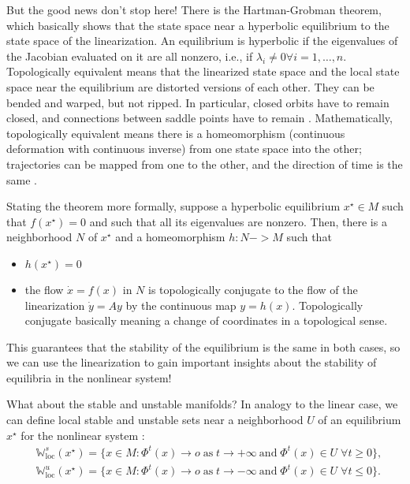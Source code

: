 But the good news don't stop here! There is the Hartman-Grobman theorem, which basically shows that the state space near a hyperbolic equilibrium to the state space of the linearization. An equilibrium is hyperbolic if the eigenvalues of the Jacobian evaluated on it are all nonzero, i.e., if $\lambda_i \neq 0 \forall i=1,\ldots,n$. Topologically equivalent means that the linearized state space and the local state space near the equilibrium are distorted versions of each other. They can be bended and warped, but not ripped. In particular, closed orbits have to remain closed, and connections between saddle points have to remain \cite{strogatz2002nonlinear}. Mathematically, topologically equivalent means there is a homeomorphism (continuous deformation with continuous inverse) from one state space into the other; trajectories can be mapped from one to the other, and the direction of time is the same \cite{strogatz2002nonlinear}. 

Stating the theorem more formally, suppose a hyperbolic equilibrium $x^\star \in M$ such that $f(x^\star) = 0$ and such that all its eigenvalues are nonzero. Then, there is a neighborhood $N$ of $x^\star$ and a homeomorphism $h: N->M$ such that \cite{argyris}
\begin{itemize}
    \item $h(x^\star) = 0$
    \item the flow $\dot{x} = f(x)$ in $N$ is topologically conjugate to the flow of the linearization $\dot{y} = A y$ by the continuous map $y = h(x)$. Topologically conjugate basically meaning a change of coordinates in a topological sense.
\end{itemize}

This guarantees that the stability of the equilibrium is the same in both cases, so we can use the linearization to gain important insights about the stability of equilibria in the nonlinear system! 

What about the stable and unstable manifolds? In analogy to the linear case, we can define local stable and unstable sets near a neighborhood $U$ of an equilibrium $x^\star$ for the nonlinear system \cite{argyris}:
% 
\begin{align}
&\mathbb{W}^s_\mathrm{loc}(x^\star) = \{x \in M: \Phi^t(x) \to o \;\mathrm{as}\; t\to+\infty\  \mathrm{and}\; \Phi^t(x) \in U \;\forall t \geq 0\}, \\
&\mathbb{W}^u_\mathrm{loc}(x^\star) = \{x \in M: \Phi^t(x) \to o \;\mathrm{as }\; t\to -\infty\ \mathrm{and}\; \Phi^t(x) \in U \;\forall t\leq 0 \}.
\end{align}

